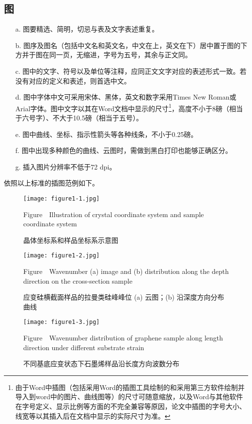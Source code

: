 \subsection{图}
\begin{enumerate}
    \item[a.] 图要精选、简明，切忌与表及文字表述重复。
    \item[b.] 图序及图名（包括中文名和英文名，中文在上，英文在下）居中置于图的下方并于图在同一页，无缩进，字号为五号，其余与正文同。
    \item[c.] 图中的文字、符号以及单位等注释，应同正文文字对应的表述形式一致。若没有对应的定义和表述，则首选中文。
    \item[d.] 图中字体中文可采用宋体、黑体，英文和数字采用Times New Roman或Arial字体。图中文字以其在Word文档中显示的尺寸\footnote{由于Word中插图（包括采用Word的插图工具绘制的和采用第三方软件绘制并导入到word中的图片、曲线图等）的尺寸可随意缩放，以及Word与其他软件在字号定义、显示比例等方面的不完全兼容等原因，论文中插图的字号大小、线宽等以其插入后在文档中显示的实际尺寸为准。}，高度不小于8磅（相当于六号字）、不大于10.5磅（相当于五号）。
    \item[e.] 图中曲线、坐标、指示性箭头等各种线条，不小于0.25磅。
    \item[f.] 图中出现多种颜色的曲线、云图时，需做到黑白打印也能够正确区分。
    \item[g.] 插入图片分辨率不低于72 dpi。
\end{enumerate}

依照以上标准的插图范例如下。
\begin{figure}[H]
    \centering
    \setlength{\abovecaptionskip}{5pt}
    \setlength{\belowcaptionskip}{2pt}
    \texttt{[image: figure1-1.jpg]}
    \caption{晶体坐标系和样品坐标系示意图}
    \label{fig:figure1-1}
    Figure\ \thefigure \ Illustration of crystal coordinate system and sample coordinate system
\end{figure}

\begin{figure}[H]
    \centering
    \setlength{\abovecaptionskip}{5pt}
    \setlength{\belowcaptionskip}{2pt}
    \texttt{[image: figure1-2.jpg]}
    \caption{应变硅横截面样品的拉曼类硅峰峰位 (a) 云图；(b) 沿深度方向分布曲线
    }
    \label{fig:figure1-2}
    Figure\ \thefigure \ Wavenumber (a) image and (b) distribution along the depth direction on the cross-section sample
\end{figure}

\begin{figure}[H]
    \centering
    \setlength{\abovecaptionskip}{5pt}
    \setlength{\belowcaptionskip}{2pt}
    \texttt{[image: figure1-3.jpg]}
    \caption{不同基底应变状态下石墨烯样品沿长度方向波数分布}
    \label{fig:figure1-3}
    Figure\ \thefigure \ Wavenumber distribution of graphene sample along length direction under different substrate strain
\end{figure}
